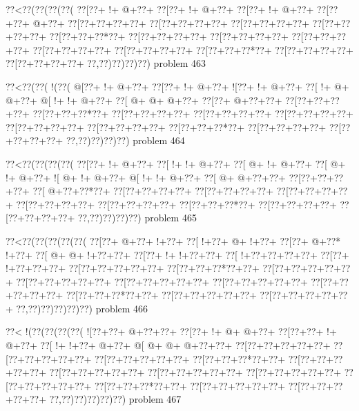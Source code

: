 \vbox{\vbox{\goo
\0??<\0??(\0??(\0??(\0??(
\0??[\0??+\- !+\- @+\0??+
\0??[\0??+\- !+\- @+\0??+
\0??[\0??+\- !+\- @+\0??+
\0??[\0??+\0??+\- @+\0??+
\0??[\0??+\0??+\0??+\0??+
\0??[\0??+\0??+\0??+\0??+
\0??[\0??+\0??+\0??+\0??+
\0??[\0??+\0??+\0??+\0??+
\0??[\0??+\0??+\0??*\0??+
\0??[\0??+\0??+\0??+\0??+
\0??[\0??+\0??+\0??+\0??+
\0??[\0??+\0??+\0??+\0??+
\0??[\0??+\0??+\0??+\0??+
\0??[\0??+\0??+\0??+\0??+
\0??[\0??+\0??+\0??*\0??+
\0??[\0??+\0??+\0??+\0??+
\0??[\0??+\0??+\0??+\0??+
\0??,\0??)\0??)\0??)\0??)
}
\hfil problem 463\hfil\break
}

\vbox{\vbox{\goo
\0??<\0??(\0??(\- !(\0??(
\- @[\0??+\- !+\- @+\0??+
\0??[\0??+\- !+\- @+\0??+
\- ![\0??+\- !+\- @+\0??+
\0??[\- !+\- @+\- @+\0??+
\- @[\- !+\- !+\- @+\0??+
\0??[\- @+\- @+\- @+\0??+
\0??[\0??+\- @+\0??+\0??+
\0??[\0??+\0??+\0??+\0??+
\0??[\0??+\0??+\0??*\0??+
\0??[\0??+\0??+\0??+\0??+
\0??[\0??+\0??+\0??+\0??+
\0??[\0??+\0??+\0??+\0??+
\0??[\0??+\0??+\0??+\0??+
\0??[\0??+\0??+\0??+\0??+
\0??[\0??+\0??+\0??*\0??+
\0??[\0??+\0??+\0??+\0??+
\0??[\0??+\0??+\0??+\0??+
\0??,\0??)\0??)\0??)\0??)
}
\hfil problem 464\hfil\break
}

\vbox{\vbox{\goo
\0??<\0??(\0??(\0??(\0??(
\0??[\0??+\- !+\- @+\0??+
\0??[\- !+\- !+\- @+\0??+
\0??[\- @+\- !+\- @+\0??+
\0??[\- @+\- !+\- @+\0??+
\- ![\- @+\- !+\- @+\0??+
\- @[\- !+\- !+\- @+\0??+
\0??[\- @+\- @+\0??+\0??+
\0??[\0??+\0??+\0??+\0??+
\0??[\- @+\0??+\0??*\0??+
\0??[\0??+\0??+\0??+\0??+
\0??[\0??+\0??+\0??+\0??+
\0??[\0??+\0??+\0??+\0??+
\0??[\0??+\0??+\0??+\0??+
\0??[\0??+\0??+\0??+\0??+
\0??[\0??+\0??+\0??*\0??+
\0??[\0??+\0??+\0??+\0??+
\0??[\0??+\0??+\0??+\0??+
\0??,\0??)\0??)\0??)\0??)
}
\hfil problem 465\hfil\break
}

\vbox{\vbox{\goo
\0??<\0??(\0??(\0??(\0??(\0??(
\0??[\0??+\- @+\0??+\- !+\0??+
\0??[\- !+\0??+\- @+\- !+\0??+
\0??[\0??+\- @+\0??*\- !+\0??+
\0??[\- @+\- @+\- !+\0??+\0??+
\0??[\0??+\- !+\- !+\0??+\0??+
\0??[\- !+\0??+\0??+\0??+\0??+
\0??[\0??+\- !+\0??+\0??+\0??+
\0??[\0??+\0??+\0??+\0??+\0??+
\0??[\0??+\0??+\0??*\0??+\0??+
\0??[\0??+\0??+\0??+\0??+\0??+
\0??[\0??+\0??+\0??+\0??+\0??+
\0??[\0??+\0??+\0??+\0??+\0??+
\0??[\0??+\0??+\0??+\0??+\0??+
\0??[\0??+\0??+\0??+\0??+\0??+
\0??[\0??+\0??+\0??*\0??+\0??+
\0??[\0??+\0??+\0??+\0??+\0??+
\0??[\0??+\0??+\0??+\0??+\0??+
\0??,\0??)\0??)\0??)\0??)\0??)
}
\hfil problem 466\hfil\break
}

\vbox{\vbox{\goo
\0??<\- !(\0??(\0??(\0??(\0??(
\- ![\0??+\0??+\- @+\0??+\0??+
\0??[\0??+\- !+\- @+\- @+\0??+
\0??[\0??+\0??+\- !+\- @+\0??+
\0??[\- !+\- !+\0??+\- @+\0??+
\- @[\- @+\- @+\- @+\0??+\0??+
\0??[\0??+\0??+\0??+\0??+\0??+
\0??[\0??+\0??+\0??+\0??+\0??+
\0??[\0??+\0??+\0??+\0??+\0??+
\0??[\0??+\0??+\0??*\0??+\0??+
\0??[\0??+\0??+\0??+\0??+\0??+
\0??[\0??+\0??+\0??+\0??+\0??+
\0??[\0??+\0??+\0??+\0??+\0??+
\0??[\0??+\0??+\0??+\0??+\0??+
\0??[\0??+\0??+\0??+\0??+\0??+
\0??[\0??+\0??+\0??*\0??+\0??+
\0??[\0??+\0??+\0??+\0??+\0??+
\0??[\0??+\0??+\0??+\0??+\0??+
\0??,\0??)\0??)\0??)\0??)\0??)
}
\hfil problem 467\hfil\break
}

